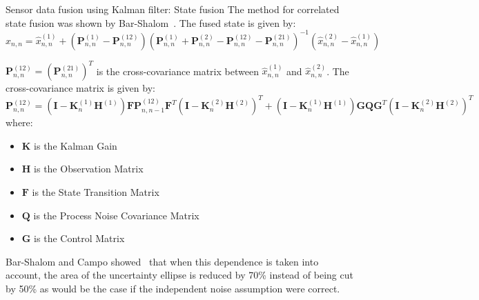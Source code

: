 \begin{frame}{Sensor data fusion using Kalman filter: State fusion}
The method for correlated state fusion was shown by Bar-Shalom~\cite{Chang_Track2TrackFusion}. The fused state is given by:
\begin{equation*}
\hat{x}_{n,n} = \hat{x}^{(1)}_{n,n} + \left( \bm{P}^{(1)}_{n,n} - \bm{P}^{(12)}_{n,n} \right) \left( \bm{P}^{(1)}_{n,n} + \bm{P}^{(2)}_{n,n} - \bm{P}^{(12)}_{n,n} - \bm{P}^{(21)}_{n,n} \right)^{-1} \left( \hat{x}^{(2)}_{n,n} - \hat{x}^{(1)}_{n,n} \right)
\end{equation*}

\(\bm{P}^{(12)}_{n,n} = \left( \bm{P}^{(21)}_{n,n} \right)^T\) is the cross-covariance matrix between \(\hat{x}^{(1)}_{n,n}\) and \(\hat{x}^{(2)}_{n,n}\). The cross-covariance matrix is given by:
\begin{equation*}
\bm{P}^{(12)}_{n,n} = \left( \bm{I} - \bm{K}^{(1)}_n \bm{H}^{(1)} \right) \bm{F} \bm{P}^{(12)}_{n,n-1} \bm{F}^T \left( \bm{I} - \bm{K}^{(2)}_n \bm{H}^{(2)} \right)^T + \left( \bm{I} - \bm{K}^{(1)}_n \bm{H}^{(1)} \right) \bm{G} \bm{Q} \bm{G}^T \left( \bm{I} - \bm{K}^{(2)}_n \bm{H}^{(2)} \right)^T
\end{equation*}
where:
\begin{itemize}
    \item \(\bm{K}\) is the Kalman Gain
    \item \(\bm{H}\) is the Observation Matrix
    \item \(\bm{F}\) is the State Transition Matrix
    \item \(\bm{Q}\) is the Process Noise Covariance Matrix
    \item \(\bm{G}\) is the Control Matrix
\end{itemize}

Bar-Shalom and Campo showed~\cite{BarShalom1986TheEO} that when this dependence is taken into account, the area of the uncertainty ellipse is reduced by 70\% instead of being cut by 50\% as would be the case if the independent noise assumption were correct.

\end{frame}



